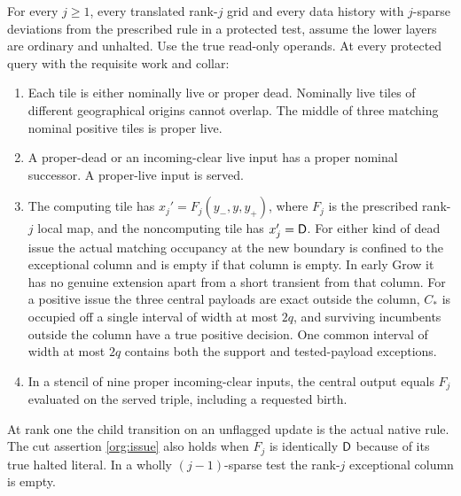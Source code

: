 \begin{proposition}\label{prop:organization}
For every \(j\ge1\), every translated rank-\(j\) grid and every data history with \(j\)-sparse deviations from the prescribed rule in a protected test, assume the lower layers are ordinary and unhalted. Use the true read-only operands. At every protected query with the requisite work and collar:
\begin{enumerate}[label=\textup{(\roman*)}]
\item\label{org:classification} Each tile is either nominally live or proper dead. Nominally live tiles of different geographical origins cannot overlap. The middle of three matching nominal positive tiles is proper live.
\item\label{org:successor} A proper-dead or an incoming-clear live input has a proper nominal successor. A proper-live input is served.
\item\label{org:issue} The computing tile has \(x_j'=F_j(y_{-},y,y_{+})\), where \(F_j\) is the prescribed rank-\(j\) local map, and the noncomputing tile has \(x_j'=\mathsf D\). For either kind of dead issue the actual matching occupancy at the new boundary is confined to the exceptional column and is empty if that column is empty. In early Grow it has no genuine extension apart from a short transient from that column. For a positive issue the three central payloads are exact outside the column, \(C_*\) is occupied off a single interval of width at most \(2q\), and surviving incumbents outside the column have a true positive decision. One common interval of width at most \(2q\) contains both the support and tested-payload exceptions.
\item\label{org:advance} In a stencil of nine proper incoming-clear inputs, the central output equals \(F_j\) evaluated on the served triple, including a requested birth.
\end{enumerate}
At rank one the child transition on an unflagged update is the actual native rule. The cut assertion \ref{org:issue} also holds when \(F_j\) is identically \(\mathsf D\) because of its true halted literal. In a wholly \((j-1)\)-sparse test the rank-\(j\) exceptional column is empty.
\end{proposition}

